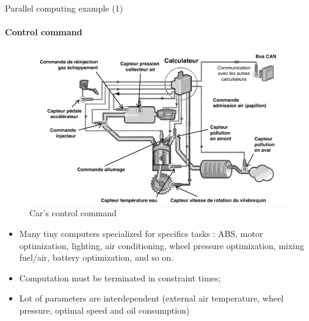 \documentclass[compress,10pt,aspectratio=169]{beamer}
\begin{document}
\begin{frame}[fragile]{Parallel computing example (1)}
    \framesubtitle{Control command}
    \small
    \begin{multicols}{2}
    \begin{figure}[h]      
    \includegraphics[width=\linewidth]{../Images/ControleCommande.png}
    \caption{Car's control command}
    \end{figure}
    \begin{itemize}
        \item Many tiny computers specialized for specifics tasks : ABS, motor optimization, lighting, air conditioning, wheel pressure optimization, 
              mixing fuel/air, battery optimization, and so on.
        \item Computation must be terminated in constraint times;
        \item Lot of parameters are interdependent (external air temperature, wheel pressure, optimal speed and oil consumption)
    \end{itemize}
    \end{multicols}
\end{frame}
\end{document}
